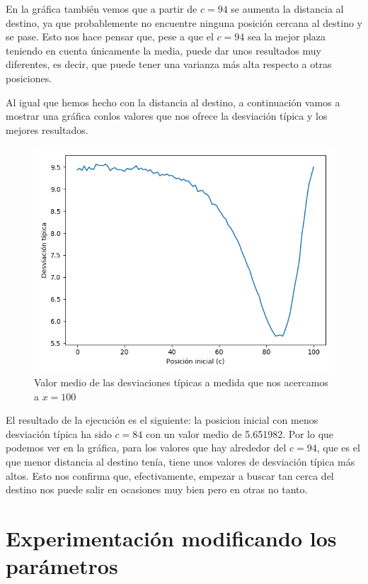 \documentclass[11pt,a4paper]{report}
\begin{document}
En la gráfica también vemos que a partir de $c=94$ se aumenta la distancia al destino, ya que probablemente no encuentre
ninguna posición cercana al destino y se pase. Esto nos hace pensar que, pese a que el $c=94$ sea la mejor plaza teniendo
en cuenta únicamente la media, puede dar unos resultados muy diferentes, es decir, que puede tener una varianza más alta
respecto a otras posiciones.

Al igual que hemos hecho con la distancia al destino, a continuación vamos a mostrar una gráfica conlos valores que nos
ofrece la desviación típica y los mejores resultados.

\begin{figure}[H]
\centering
\includegraphics[scale=0.7]{img/dt-100-2-90.png}
\caption{Valor medio de las desviaciones típicas a medida que nos acercamos a $x=100$}
\end{figure}

El resultado de la ejecución es el siguiente: la posicion inicial con menos desviación típica ha sido $c=84$ con un valor
medio de 5.651982. Por lo que podemos ver en la gráfica, para los valores que hay alrededor del $c=94$, que es el que
menor distancia al destino tenía, tiene unos valores de desviación típica más altos. Esto nos confirma que, efectivamente,
empezar a buscar tan cerca del destino nos puede salir en ocasiones muy bien pero en otras no tanto.


\section{Experimentación modificando los parámetros}
\end{document}
